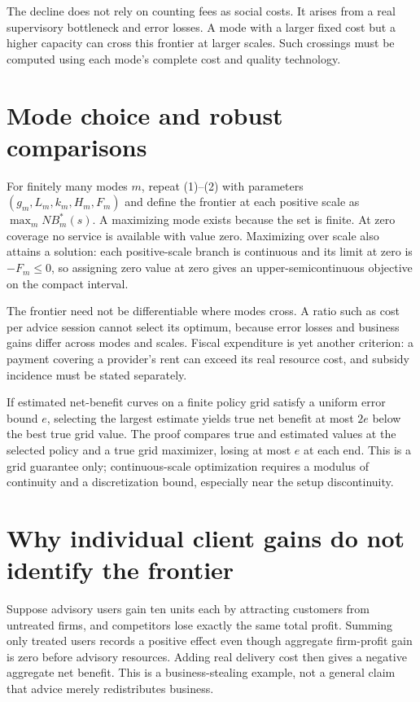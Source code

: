 \documentclass[11pt,a4paper]{article}
\begin{document}
The decline does not rely on counting fees as social costs. It arises from a real supervisory bottleneck and error losses. A mode with a larger fixed cost but a higher capacity can cross this frontier at larger scales. Such crossings must be computed using each mode's complete cost and quality technology.
\section{Mode choice and robust comparisons}
For finitely many modes $m$, repeat (1)--(2) with parameters $(g_m,L_m,k_m,H_m,F_m)$ and define the frontier at each positive scale as
$\max_m NB_m^*(s)$. A maximizing mode exists because the set is finite. At zero coverage no service is available with value zero. Maximizing over scale also attains a solution: each positive-scale branch is continuous and its limit at zero is $-F_m\le0$, so assigning zero value at zero gives an upper-semicontinuous objective on the compact interval.

The frontier need not be differentiable where modes cross. A ratio such as cost per advice session cannot select its optimum, because error losses and business gains differ across modes and scales. Fiscal expenditure is yet another criterion: a payment covering a provider's rent can exceed its real resource cost, and subsidy incidence must be stated separately.

If estimated net-benefit curves on a finite policy grid satisfy a uniform error bound $e$, selecting the largest estimate yields true net benefit at most $2e$ below the best true grid value. The proof compares true and estimated values at the selected policy and a true grid maximizer, losing at most $e$ at each end. This is a grid guarantee only; continuous-scale optimization requires a modulus of continuity and a discretization bound, especially near the setup discontinuity.
\section{Why individual client gains do not identify the frontier}
Suppose advisory users gain ten units each by attracting customers from untreated firms, and competitors lose exactly the same total profit. Summing only treated users records a positive effect even though aggregate firm-profit gain is zero before advisory resources. Adding real delivery cost then gives a negative aggregate net benefit. This is a business-stealing example, not a general claim that advice merely redistributes business.
\end{document}

